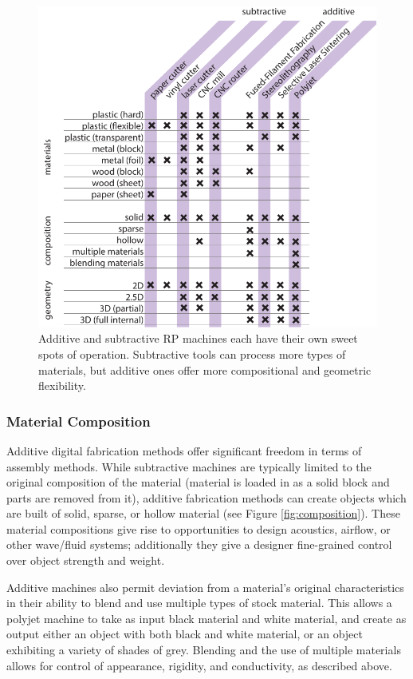 \begin{figure}
\centering
\includegraphics[width=5in]{figures/materials-machines.pdf}
\caption{Additive and subtractive RP machines each have their own sweet spots of operation. Subtractive tools can process more types of materials, but additive ones offer more compositional and geometric flexibility.}
\label{table:materials-machines}
\end{figure}

\subsubsection{Material Composition}

Additive digital fabrication methods offer significant freedom in terms of assembly methods. While subtractive machines are typically limited to the original composition of the material (material is loaded in as a solid block and parts are removed from it), additive fabrication methods can create objects which are built of solid, sparse, or hollow material (see Figure \ref{fig:composition}). These material compositions give rise to opportunities to design acoustics, airflow, or other wave/fluid systems; additionally they give a designer fine-grained control over object strength and weight.

Additive machines also permit deviation from a material's original characteristics in their ability to blend and use multiple types of stock material. This allows a polyjet machine to take as input black material and white material, and create as output either an object with both black and white material, or an object exhibiting a variety of shades of grey. Blending and the use of multiple materials allows for control of appearance, rigidity, and conductivity, as described above.

